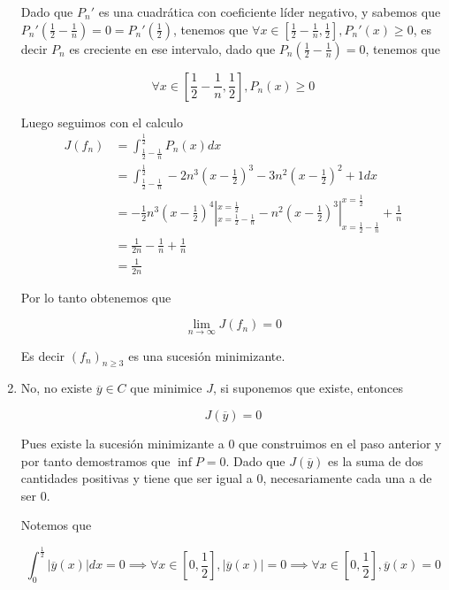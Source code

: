 \documentclass[a4paper,oneside,10.5pt]{USMArt}
\begin{document}
\begin{sol}
\begin{enumerate}
    Dado que $P_{n}'$ es una cuadrática con coeficiente líder negativo, y sabemos
    que $P_{n}'(\frac12 - \frac1n) = 0 = P_{n}'(\frac12)$, tenemos
    que $\forall x \in [\frac12  - \frac1n, \frac12], P_{n}'(x) \geq 0$,
    es decir $P_{n}$ es creciente en ese intervalo, dado que $P_{n}(\frac12 - \frac1n) = 0$, tenemos que

    \begin{equation*}
      \forall x \in [\frac12 - \frac1n, \frac12], P_{n}(x) \geq 0
    \end{equation*}

    Luego seguimos con el calculo
    \begin{align*}
      J(f_{n}) &= \int_{\frac12 - \frac1n}^{\frac12} P_{n}(x) dx\\
               &= \int_{\frac12 - \frac1n}^{\frac12} -2n^{3}(x - \frac12)^{3} - 3n^{2}(x - \frac12)^{2} + 1 dx\\
               &= -\frac{1}{2}n^{3}(x - \frac12)^{4}|_{x = \frac12 - \frac1n}^{x = \frac12} - n^{2}(x - \frac12)^{3}|_{x = \frac12 - \frac1n}^{x = \frac12} + \frac1n\\
               &= \frac{1}{2n} - \frac{1}{n} + \frac{1}{n}\\
               &= \frac{1}{2n}
    \end{align*}

    Por lo tanto obtenemos que

    \begin{equation*}
      \lim_{n \to \infty} J(f_{n}) = 0
    \end{equation*}

    Es decir $(f_{n})_{n \geq 3}$ es una sucesión minimizante.

    \item No, no existe $\overline{y} \in C$ que minimice $J$, si suponemos que existe, entonces

    \begin{equation*}
      J(\overline{y}) = 0
    \end{equation*}

    Pues existe la sucesión minimizante a $0$ que construimos en el paso anterior y por tanto
    demostramos que $\inf P = 0$. Dado que $J(\overline{y})$ es la suma de dos cantidades positivas
    y tiene que ser igual a $0$, necesariamente cada una a de ser $0$.

    Notemos que

    \begin{equation*}
      \int_{0}^{\frac12} |\overline{y}(x)| dx = 0 \implies \forall x \in [0, \frac12], |\overline{y}(x)| = 0 \implies \forall x \in [0, \frac12], \overline{y}(x) = 0
    \end{equation*}


\end{enumerate}
\end{sol}
\end{document}
